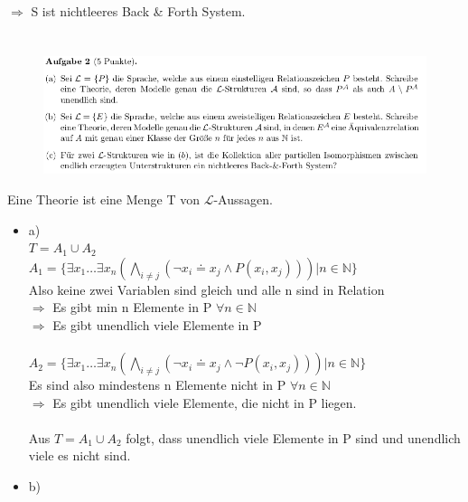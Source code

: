 \documentclass[a4paper]{scrartcl}
\begin{document}
    $\Rightarrow$ S ist nichtleeres Back \& Forth System.
    



\section*{}%
\label{sec:aufgabe_2}

    \begin{figure}[H]
        \centering
        \includegraphics[scale=0.6]{./A-2.png}
        \label{fig:}
    \end{figure}

    Eine Theorie ist eine Menge T von $\mathscr{L}$-Aussagen.

    \begin{itemize}
        \item a)\\
            $T = A_1 \cup A_2$\\
            $A_1 = \{\exists x_1 \dots \exists x_n (\bigwedge_{i \neq j}(\neg x_i \doteq x_j \land P(x_i,x_j))) | n \in \mathds{N}\}$\\
            Also keine zwei Variablen sind gleich und alle n sind in Relation\\
            $\Rightarrow$ Es gibt min n Elemente in P $\forall n \in \mathds{N}$\\
            $\Rightarrow$ Es gibt unendlich viele Elemente in P\\
            \\$A_2 = \{\exists x_1 \dots \exists x_n (\bigwedge_{i \neq j}(\neg x_i \doteq x_j \land \neg P(x_i,x_j))) | n \in \mathds{N}\}$\\
            Es sind also mindestens n Elemente nicht in P $\forall n \in \mathds{N}$\\
            $\Rightarrow$ Es gibt unendlich viele Elemente, die nicht in P liegen.\\
            \\Aus $T = A_1 \cup A_2$ folgt, dass unendlich viele Elemente in P sind und unendlich viele es nicht sind.\\

        \item b)\\

    \end{itemize}
\end{document}
